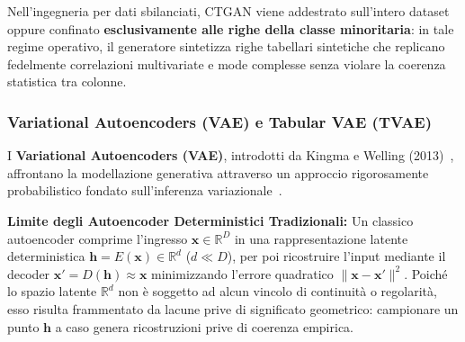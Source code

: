 Nell'ingegneria per dati sbilanciati, CTGAN viene addestrato sull'intero dataset oppure confinato \textbf{esclusivamente alle righe della classe minoritaria}: in tale regime operativo, il generatore sintetizza righe tabellari sintetiche che replicano fedelmente correlazioni multivariate e mode complesse senza violare la coerenza statistica tra colonne.

\FloatBarrier
\subsubsection{Variational Autoencoders (VAE) e Tabular VAE (TVAE)}
\label{subsec:dm-vae-tvae}

I \textbf{Variational Autoencoders (VAE)}, introdotti da Kingma e Welling (2013)~\cite{kingma2013}, affrontano la modellazione generativa attraverso un approccio rigorosamente probabilistico fondato sull'inferenza variazionale~\cite{mannocci2026imbalanced}.

\textbf{Limite degli Autoencoder Deterministici Tradizionali:}
Un classico autoencoder comprime l'ingresso $\mathbf{x} \in \mathbb{R}^D$ in una rappresentazione latente deterministica $\mathbf{h} = E(\mathbf{x}) \in \mathbb{R}^d$ ($d \ll D$), per poi ricostruire l'input mediante il decoder $\mathbf{x}' = D(\mathbf{h}) \approx \mathbf{x}$ minimizzando l'errore quadratico $\|\mathbf{x} - \mathbf{x}'\|^2$. Poiché lo spazio latente $\mathbb{R}^d$ non è soggetto ad alcun vincolo di continuità o regolarità, esso risulta frammentato da lacune prive di significato geometrico: campionare un punto $\mathbf{h}$ a caso genera ricostruzioni prive di coerenza empirica.

